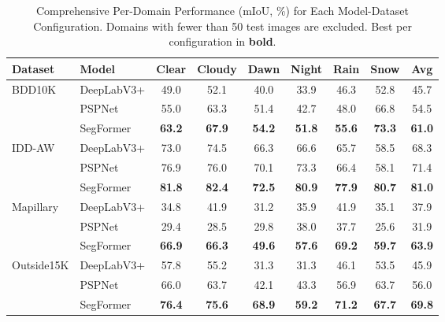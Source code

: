 \begin{table}[t]
\centering
\caption{Comprehensive Per-Domain Performance (mIoU, \%) for Each Model-Dataset Configuration. Domains with fewer than 50 test images are excluded. Best per configuration in \textbf{bold}.}
\label{tab:comprehensive_results}
\begin{tabular}{@{}llcccccc|c@{}}
\toprule
\textbf{Dataset} & \textbf{Model} & \textbf{Clear} & \textbf{Cloudy} & \textbf{Dawn} & \textbf{Night} & \textbf{Rain} & \textbf{Snow} & \textbf{Avg} \\
\midrule
\multirow{3}{*}{BDD10K}
  & DeepLabV3+ & 49.0 & 52.1 & 40.0 & 33.9 & 46.3 & 52.8 & 45.7 \\
  & PSPNet     & 55.0 & 63.3 & 51.4 & 42.7 & 48.0 & 66.8 & 54.5 \\
  & SegFormer  & \textbf{63.2} & \textbf{67.9} & \textbf{54.2} & \textbf{51.8} & \textbf{55.6} & \textbf{73.3} & \textbf{61.0} \\
\midrule
\multirow{3}{*}{IDD-AW}
  & DeepLabV3+ & 73.0 & 74.5 & 66.3 & 66.6 & 65.7 & 58.5 & 68.3 \\
  & PSPNet     & 76.9 & 76.0 & 70.1 & 73.3 & 66.4 & 58.1 & 71.4 \\
  & SegFormer  & \textbf{81.8} & \textbf{82.4} & \textbf{72.5} & \textbf{80.9} & \textbf{77.9} & \textbf{80.7} & \textbf{81.0} \\
\midrule
\multirow{3}{*}{Mapillary}
  & DeepLabV3+ & 34.8 & 41.9 & 31.2 & 35.9 & 41.9 & 35.1 & 37.9 \\
  & PSPNet     & 29.4 & 28.5 & 29.8 & 38.0 & 37.7 & 25.6 & 31.9 \\
  & SegFormer  & \textbf{66.9} & \textbf{66.3} & \textbf{49.6} & \textbf{57.6} & \textbf{69.2} & \textbf{59.7} & \textbf{63.9} \\
\midrule
\multirow{3}{*}{Outside15K}
  & DeepLabV3+ & 57.8 & 55.2 & 31.3 & 31.3 & 46.1 & 53.5 & 45.9 \\
  & PSPNet     & 66.0 & 63.7 & 42.1 & 43.3 & 56.9 & 63.7 & 56.0 \\
  & SegFormer  & \textbf{76.4} & \textbf{75.6} & \textbf{68.9} & \textbf{59.2} & \textbf{71.2} & \textbf{67.7} & \textbf{69.8} \\
\bottomrule
\end{tabular}
\end{table}



